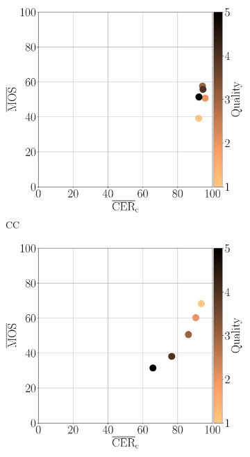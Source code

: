 \begin{figure}[h!]
\begin{subfigure}[b]{0.3\textwidth}
    \end{subfigure}
    \newline
    \begin{subfigure}[b]{0.3\textwidth}
        \includegraphics[width=\textwidth]{../../images/analyze/mos_cer_ref_mean_ezocr_CC.pdf}
        \caption{CC}
        \label{fig:mos_cer_ref_mean_ezocr_CC}
    \end{subfigure}
    \hfill
    \begin{subfigure}[b]{0.3\textwidth}
        \includegraphics[width=\textwidth]{../../images/analyze/mos_cer_ref_mean_ezocr_JPEG.pdf}

\end{subfigure}
\end{figure}
